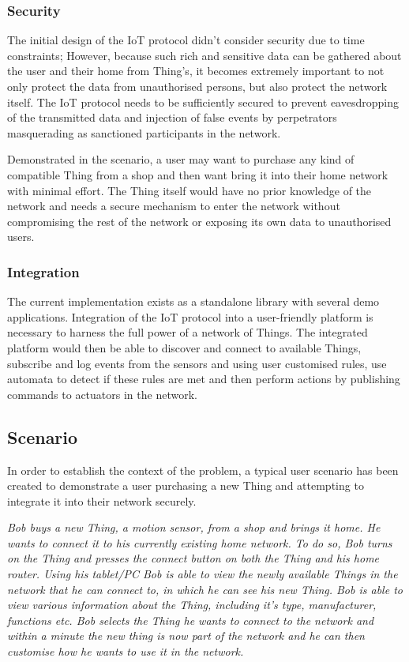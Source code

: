 \documentclass{mprop}
\begin{document}
\subsubsection*{Security} %
\label{ssub:security}

The initial design of the IoT protocol didn't consider security due to time constraints; However, because such rich and sensitive data can be gathered about the user and their home from Thing's, it becomes extremely important to not only protect the data from unauthorised persons, but also protect the network itself. The IoT protocol needs to be sufficiently secured to prevent eavesdropping of the transmitted data and injection of false events by perpetrators masquerading as sanctioned participants in the network. 


Demonstrated in the scenario, a user may want to purchase any kind of compatible Thing from a shop and then want bring it into their home network with minimal effort. The Thing itself would have no prior knowledge of the network and needs a secure mechanism to enter the network without compromising the rest of the network or exposing its own data to unauthorised users. 

\subsubsection*{Integration} %
\label{ssub:integration}

The current implementation exists as a standalone library with several demo applications. Integration of the IoT protocol into a user-friendly platform is necessary to harness the full power of a network of Things. The integrated platform would then be able to discover and connect to available Things, subscribe and log events from the sensors and using user customised rules, use automata to detect if these rules are met and then perform actions by publishing commands to actuators in the network.

\subsection{Scenario} %
\label{sub:scenario}
In order to establish the context of the problem, a typical user scenario has been created to demonstrate a user purchasing a new Thing and attempting to integrate it into their network securely.

\textit{Bob buys a new Thing, a motion sensor, from a shop and brings it home. He wants to connect it to his currently existing home network. To do so, Bob turns on the Thing and presses the connect button on both the Thing and his home router. Using his tablet/PC Bob is able to view the newly available Things in the network that he can connect to, in which he can see his new Thing. Bob is able to view various information about the Thing, including it's type, manufacturer, functions etc. Bob selects the Thing he wants to connect to the network and within a minute the new thing is now part of the network and he can then customise how he wants to use it in the network.}
\end{document}
